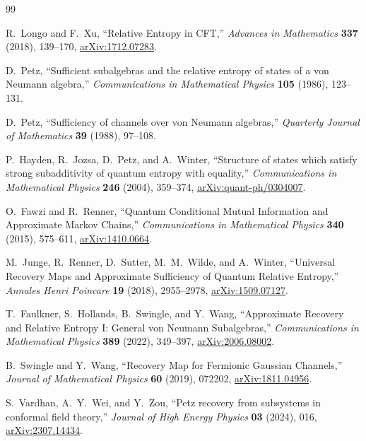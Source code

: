 \documentclass[11pt]{article}
\theoremstyle{accenttheorem}
\theoremstyle{definition}
\newcommand{\1}{\mathbf{1}}
\begin{document}
\vspace{0.8em}
\begin{thebibliography}{99}

R.~Longo and F.~Xu,
``Relative Entropy in CFT,''
\emph{Advances in Mathematics} \textbf{337} (2018), 139--170,
\href{https://arxiv.org/abs/1712.07283}{arXiv:1712.07283}.

D.~Petz,
``Sufficient subalgebras and the relative entropy of states of a von Neumann algebra,''
\emph{Communications in Mathematical Physics} \textbf{105} (1986), 123--131.

D.~Petz,
``Sufficiency of channels over von Neumann algebras,''
\emph{Quarterly Journal of Mathematics} \textbf{39} (1988), 97--108.

P.~Hayden, R.~Jozsa, D.~Petz, and A.~Winter,
``Structure of states which satisfy strong subadditivity of quantum entropy with equality,''
\emph{Communications in Mathematical Physics} \textbf{246} (2004), 359--374,
\href{https://arxiv.org/abs/quant-ph/0304007}{arXiv:quant-ph/0304007}.

O.~Fawzi and R.~Renner,
``Quantum Conditional Mutual Information and Approximate Markov Chains,''
\emph{Communications in Mathematical Physics} \textbf{340} (2015), 575--611,
\href{https://arxiv.org/abs/1410.0664}{arXiv:1410.0664}.

M.~Junge, R.~Renner, D.~Sutter, M.~M.~Wilde, and A.~Winter,
``Universal Recovery Maps and Approximate Sufficiency of Quantum Relative Entropy,''
\emph{Annales Henri Poincare} \textbf{19} (2018), 2955--2978,
\href{https://arxiv.org/abs/1509.07127}{arXiv:1509.07127}.

T.~Faulkner, S.~Hollands, B.~Swingle, and Y.~Wang,
``Approximate Recovery and Relative Entropy I: General von Neumann Subalgebras,''
\emph{Communications in Mathematical Physics} \textbf{389} (2022), 349--397,
\href{https://arxiv.org/abs/2006.08002}{arXiv:2006.08002}.

B.~Swingle and Y.~Wang,
``Recovery Map for Fermionic Gaussian Channels,''
\emph{Journal of Mathematical Physics} \textbf{60} (2019), 072202,
\href{https://arxiv.org/abs/1811.04956}{arXiv:1811.04956}.

S.~Vardhan, A.~Y.~Wei, and Y.~Zou,
``Petz recovery from subsystems in conformal field theory,''
\emph{Journal of High Energy Physics} \textbf{03} (2024), 016,
\href{https://arxiv.org/abs/2307.14434}{arXiv:2307.14434}.


\end{thebibliography}
\end{document}
